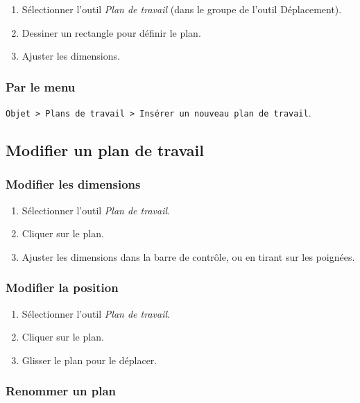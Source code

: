 \begin{enumerate}
    \item Sélectionner l'outil \emph{Plan de travail} (dans le groupe de l'outil Déplacement).
    \item Dessiner un rectangle pour définir le plan.
    \item Ajuster les dimensions.
\end{enumerate}

\subsubsection{Par le menu}

\texttt{Objet > Plans de travail > Insérer un nouveau plan de travail}.

\subsection{Modifier un plan de travail}

\subsubsection{Modifier les dimensions}

\begin{enumerate}
    \item Sélectionner l'outil \emph{Plan de travail}.
    \item Cliquer sur le plan.
    \item Ajuster les dimensions dans la barre de contrôle, ou en tirant sur les poignées.
\end{enumerate}

\subsubsection{Modifier la position}

\begin{enumerate}
    \item Sélectionner l'outil \emph{Plan de travail}.
    \item Cliquer sur le plan.
    \item Glisser le plan pour le déplacer.
\end{enumerate}

\subsubsection{Renommer un plan}

